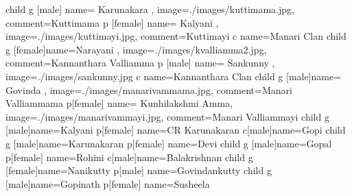 \documentclass{article}
\begin{document}
\begin{landscape}
\begin{genealogypicture}
{{{			child {
    				g [male] {name= Karunakara , image={./images/kuttimama.jpg}, comment={Kuttimama}}
				p [female] {name= Kalyani , image={./images/kuttimayi.jpg}, comment={Kuttimayi}}
				c {name=Manari Clan}
   			}
  		}
  		child {
   			g [female]{name={Narayani }, image={./images/kvalliamma2.jpg}, comment={Kannanthara Valliamma}}
   			p [male] {name={ Sankunny }, image={./images/sankunny.jpg}}
			c {name=Kannanthara Clan}
  		}
  		child {
   			g [male]{name={ Govinda }, image={./images/manarivammama.jpg},  comment={Manari Valliammama}}
   			p[female] {name={ Kunhilakshmi Amma}, image={./images/manarivammayi.jpg},  comment={Manari Valliammayi}}
			child {
   				g [male]{name=Kalyani}
   				p[female] {name=CR Karunakaran}
  			}
			c[male]{name=Gopi}
			child {
   				g [male]{name=Karunakaran}
   				p[female] {name=Devi}
  			}
			child {
   				g [male]{name=Gopal}
   				p[female] {name=Rohini}
  			}
			c[male]{name=Balakrishnan}
			child {
   				g [female]{name=Nanikutty}
   				p[male] {name=Govindankutty}
  			}
			child {
   				g [male]{name=Gopinath}
   				p[female] {name=Susheela}
  			}
  		}
	}
}

\end{genealogypicture}

\end{landscape}
\end{document}
